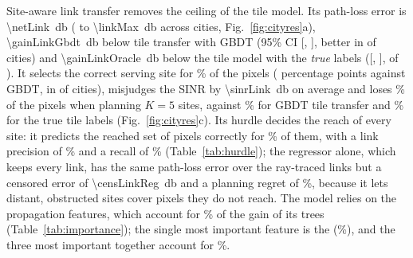 Site-aware link transfer removes the ceiling of the tile model. Its
path-loss error is \SI{\netLink}{\decibel} (\linkMin{} to
\SI{\linkMax}{\decibel} across cities, Fig.~\ref{fig:cityres}a),
\SI{\gainLinkGbdt}{\decibel} below tile transfer with GBDT (95\% CI
[\loNetLinkGbdt, \hiNetLinkGbdt], better in \nNetLinkGbdt{} of \nFolds{}
cities) and \SI{\gainLinkOracle}{\decibel} below the tile model with the
\emph{true} labels ([\loNetLinkOracle, \hiNetLinkOracle], \nNetLinkOracle{}
of \nFolds). It selects the correct serving site for \assocLink\% of the
pixels (\dNetLinkAssoc{} percentage points against GBDT, in
\nNetLinkAssoc{} of \nFolds{} cities), misjudges the SINR by
\SI{\sinrLink}{\decibel} on average and loses \regretLink\% of the pixels
when planning $K=5$ sites, against \regretGbdt\% for GBDT tile transfer and
\regretOracle\% for the true tile labels (Fig.~\ref{fig:cityres}c). Its
hurdle decides the reach of every site: it predicts the reached set of
pixels correctly for \reachLink\% of them, with a link precision of
\linkPrecLink\% and a recall of \linkRecLink\% (Table~\ref{tab:hurdle});
the regressor alone, which keeps every link, has the same path-loss error
over the ray-traced links but a censored error of
\SI{\censLinkReg}{\decibel} and a planning regret of \regretLinkReg\%,
because it lets distant, obstructed sites cover pixels they do not reach.
The model relies on the propagation features, which account for
\linkFeatShare\% of the gain of its trees (Table~\ref{tab:importance}); the
single most important feature is the \topLinkFeat{} (\topLinkFeatShare\%),
and the three most important together account for \topThreeLinkShare\%.

\begin{table}[!tp]
\centering
\caption{Network-level evaluation on the held-out cities (mean over cities).
Oracle: tile model with the true labels. Path loss: RMSE and bias over the
ray-traced links, and RMSE over all pairs with prediction and truth clipped
at the cut-off (cens.). Serving site: share of reached pixels with the
correct serving site. Coverage: agreement of covered pixels (serving path
loss $\le\SI{130}{\decibel}$) and error of the covered share. SINR: mean
absolute error and Kolmogorov--Smirnov distance of the distributions. SE:
error of mean spectral efficiency (b/s/Hz). Regret: coverage lost by
planning $K=5$ sites on the predicted map instead of the true map. True
covered share: \covTrue\%; true mean spectral efficiency: \seTrue{}\,b/s/Hz.
Few-shot rows are scored on the unsurveyed pixels.}
\label{tab:network}
\small\setlength{\tabcolsep}{3.5pt}
%
\end{table}

